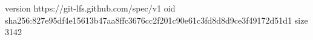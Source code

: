 version https://git-lfs.github.com/spec/v1
oid sha256:827e95df4e15613b47aa8ffc3676cc2f201c90e61c3fd8d8d9ce3f49172d51d1
size 3142
